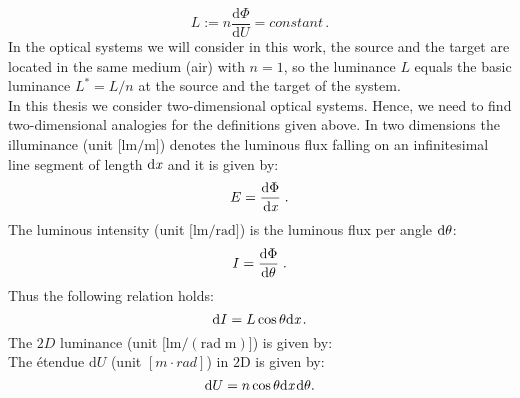 \begin{equation}\label{basicluminance}
L := n \frac{\textrm{d}\Phi}{\textrm{d}U} = constant\,.
\end{equation}
 In the optical systems we will consider in this work, the source and the target are located in the same medium (air) with $n=1$, so the luminance $L$ equals the basic luminance $L^* = L/n$ at the source and the target of the system.\\
\indent In this thesis we consider two-dimensional optical systems. 
 Hence, we need to find two-dimensional analogies for the definitions given above.
In two dimensions the illuminance \big(unit $\big[\textrm{lm}/\textrm{m}\big]$\big) denotes the luminous flux falling on an infinitesimal line segment of length $\textrm{d}\textit{x}$ 
and it is given by:
 \begin{equation}
 E=\frac{\textrm{d}\Phi}{\textrm{d}\textit{x}}\;.
 \end{equation}
 The luminous intensity \big(unit $\big[\textrm{lm}/\textrm{rad}\big]$\big) is the luminous flux per angle $\textrm{d}\mbox{$\theta$}$:
 \begin{equation}
 I=\frac{\textrm{d}\Phi}{\textrm{d}\mbox{$\theta$}}\;.
 \end{equation}
 Thus the following relation holds:
 \begin{equation}
 \textrm{d}I = L\cos\mbox{$\theta$}\textrm{d}\textit{x}\,.
 \end{equation}
 The $2D$ luminance \big(unit $\big[\textrm{lm}/(\textrm{rad}\; \textrm{m})\big]$\big) is given by:
 \begin{equation}
 \end{equation}
  The \'{e}tendue $\textrm{d}U $ (unit $[m\cdot rad]$) in $2$D is given by:
\begin{equation}\label{etendue2d}
\textrm{d}U = n\cos\mbox{$\theta$}\textrm{d}\textit{x}\,\textrm{d}\mbox{$\theta$}.
\end{equation}

